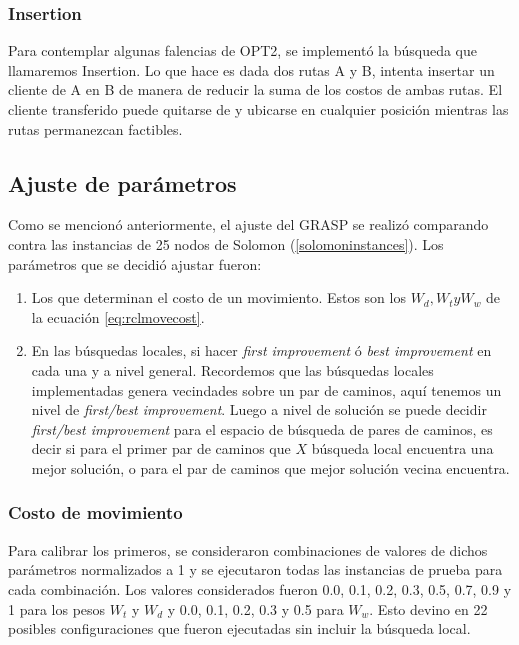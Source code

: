 \documentclass{article}
\begin{document}
  \subsubsection*{Insertion}

  Para contemplar algunas falencias de OPT2, se implementó la búsqueda que llamaremos Insertion. Lo que hace es dada dos rutas A y B, intenta insertar un cliente de A en B de manera de reducir la suma de los costos de ambas rutas. El cliente transferido puede quitarse de y ubicarse en cualquier posición mientras las rutas permanezcan factibles.

  \subsection*{Ajuste de parámetros}

  Como se mencionó anteriormente, el ajuste del GRASP se realizó comparando contra las instancias de 25 nodos de Solomon (\ref{solomoninstances}). Los parámetros que se decidió ajustar fueron:

  \begin{enumerate}
    \item {Los que determinan el costo de un movimiento. Estos son los $W_d, W_t y W_w$ de la ecuación \ref{eq:rclmovecost}}.
    \item {En las búsquedas locales, si hacer {\it first improvement} ó {\it best improvement} en cada una y a nivel general. Recordemos que las búsquedas locales implementadas genera vecindades sobre un par de caminos, aquí tenemos un nivel de {\it first/best improvement}. Luego a nivel de solución se puede decidir {\it first/best improvement} para el espacio de búsqueda de pares de caminos, es decir si para el primer par de caminos que $X$ búsqueda local encuentra una mejor solución, o para el par de caminos que mejor solución vecina encuentra.}
  \end{enumerate}

  \subsubsection*{Costo de movimiento}

  Para calibrar los primeros, se consideraron combinaciones de valores de dichos parámetros normalizados a 1 y se ejecutaron todas las instancias de prueba para cada combinación. Los valores considerados fueron 0.0, 0.1, 0.2, 0.3, 0.5, 0.7, 0.9 y 1 para los pesos $W_t$ y $W_d$ y 0.0, 0.1, 0.2, 0.3 y 0.5 para $W_w$. Esto devino en 22 posibles configuraciones que fueron ejecutadas sin incluir la búsqueda local.
\end{document}
